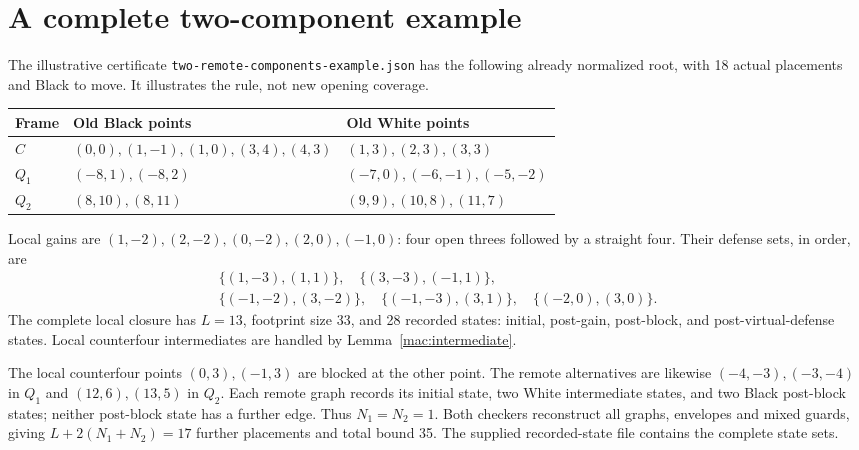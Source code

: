 \documentclass[11pt]{article}
\theoremstyle{definition}
\theoremstyle{remark}
\newcommand{\code}[1]{\texttt{#1}}
\begin{document}
\par\endgroup

\section{A complete two-component example}\label{app:remote-example}
The illustrative certificate \code{two-remote-components-example.json}
has the following already normalized root, with 18 actual placements
and Black to move. It illustrates the rule, not new opening coverage.
\begin{center}\small
\begin{tabular}{@{}lll@{}}\toprule
Frame & Old Black points & Old White points\\\midrule
$C$ & $(0,0),(1,-1),(1,0),(3,4),(4,3)$ & $(1,3),(2,3),(3,3)$\\
$Q_1$ & $(-8,1),(-8,2)$ & $(-7,0),(-6,-1),(-5,-2)$\\
$Q_2$ & $(8,10),(8,11)$ & $(9,9),(10,8),(11,7)$\\\bottomrule
\end{tabular}\end{center}
Local gains are $(1,-2),(2,-2),(0,-2),(2,0),(-1,0)$: four open
threes followed by a straight four. Their defense sets, in order, are
\[
\begin{gathered}
\{(1,-3),(1,1)\},\quad\{(3,-3),(-1,1)\},\\
\{(-1,-2),(3,-2)\},\quad\{(-1,-3),(3,1)\},\quad\{(-2,0),(3,0)\}.
\end{gathered}
\]
The complete local closure has $L=13$, footprint size 33, and 28 recorded
states: initial, post-gain, post-block, and post-virtual-defense states.
Local counterfour intermediates are handled by Lemma~\ref{mac:intermediate}.

The local counterfour points $(0,3),(-1,3)$ are blocked at the other
point. The remote alternatives are likewise $(-4,-3),(-3,-4)$ in $Q_1$
and $(12,6),(13,5)$ in $Q_2$. Each remote graph records its initial
state, two White intermediate states, and two Black post-block states;
neither post-block state has a further edge. Thus $N_1=N_2=1$.
Both checkers reconstruct all graphs, envelopes and mixed guards, giving
$L+2(N_1+N_2)=17$ further placements and total bound 35.
The supplied recorded-state file contains the complete state sets.
\end{document}
